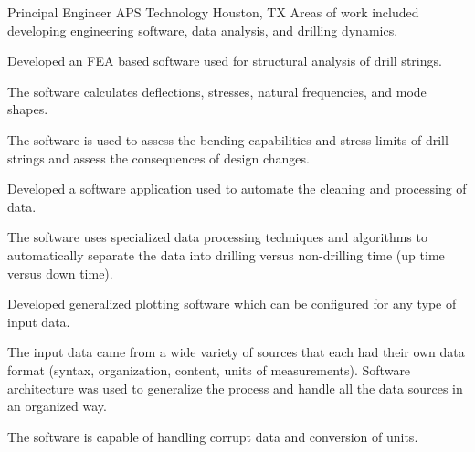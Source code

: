 \documentclass{leresume}
\begin{document}
            {Principal Engineer}
            {APS Technology}
			{Houston, TX}
			Areas of work included developing engineering software, data analysis, and drilling dynamics.\nolinebreak[4]
		\begin{bulletedlist}
			
		\item 
					Developed an FEA based software used for structural analysis of drill strings.
				
		\begin{bulletedlist}
			
		\item 
						The software calculates deflections, stresses, natural frequencies, and mode shapes.
					
		\item 
						The software is used to assess the bending capabilities and stress limits of drill strings and assess the consequences of design changes.
					
		\end{bulletedlist}
	
		\item 
					Developed a software application used to automate the cleaning and processing of data.
				
		\begin{bulletedlist}
			
		\item 
						The software uses specialized data processing techniques and algorithms to automatically separate the data into drilling versus non-drilling time (up time versus down time).
					
		\end{bulletedlist}
	
		\item 
					Developed generalized plotting software which can be configured for any type of input data.
				
		\begin{bulletedlist}
			
		\item 
						The input data came from a wide variety of sources that each had their own data format (syntax, organization, content, units of measurements).  Software architecture
						was used to generalize the process and handle all the data sources in an organized way.
					
		\item 
						The software is capable of handling corrupt data and conversion of units.
					
		\end{bulletedlist}
	
		\end{bulletedlist}
	
\end{document}
